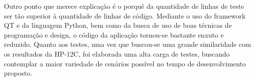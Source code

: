 Outro ponto que merece explicação é o porquê da quantidade de linhas de teste ser tão superior à quantidade de linhas de código. Mediante o uso do framework QT e da linguagem Python, bem como da busca de uso de boas técnicas de programação e design, o código da aplicação tornou-se bastante enxuto e reduzido. Quanto aos testes, uma vez que buscou-se uma grande similaridade com os resultados da HP-12C, foi elaborada uma alta carga de testes, buscando contemplar a maior variedade de cenários possível no tempo de desenvolvimento proposto.



